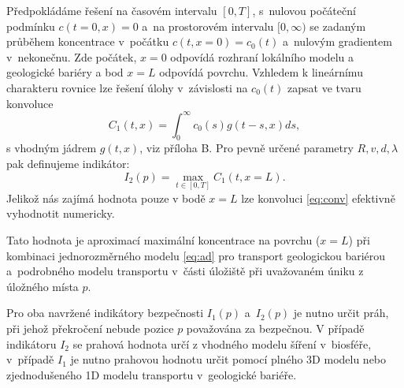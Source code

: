 \documentclass{article}
\begin{document}
Předpokládáme řešení na časovém intervalu  $[0, T]$, s~nulovou počáteční podmínku $c(t=0, x) = 0$ a~na prostorovém intervalu $[0, \infty)$ se zadaným 
průběhem koncentrace v~počátku $c(t, x=0) = c_0(t)$ a~nulovým gradientem v~nekonečnu. Zde počátek, $x=0$ odpovídá rozhraní lokálního modelu a geologické bariéry a bod $x=L$ odpovídá povrchu.
Vzhledem k lineárnímu charakteru rovnice lze řešení úlohy v~závislosti na $c_0(t)$ zapsat ve tvaru konvoluce
\begin{equation}
    \label{eq:conv}
    C_1(t, x) = \int_{0}^\infty c_0(s) g(t - s, x) ds,
\end{equation}
s  vhodným jádrem $g(t, x)$, viz příloha B. Pro pevně určené parametry $R, v, d, \lambda$ pak definujeme indikátor:
\begin{equation}
    I_2(p) =  \max_{t\in[0, T]} C_1(t, x=L).
\end{equation}
Jelikož nás zajímá hodnota pouze v bodě $x=L$ lze konvoluci \eqref{eq:conv} efektivně vyhodnotit numericky.

Tato hodnota je aproximací maximální koncentrace na povrchu ($x=L$)
při kombinaci jednorozměrného modelu \eqref{eq:ad} pro transport geologickou bariérou a~podrobného 
modelu transportu v~části úložiště při uvažovaném úniku z úložného místa $p$. 

Pro oba navržené indikátory bezpečnosti $I_1(p)$ a~$I_2(p)$ je nutno určit práh, při jehož překročení nebude pozice $p$ považována za bezpečnou. V případě indikátoru $I_2$ se prahová hodnota určí z vhodného modelu šíření  v~biosféře, v~případě $I_1$ je nutno prahovou hodnotu určit pomocí plného 3D modelu nebo zjednodušeného 1D modelu transportu v~geologické bariéře.
\end{document}
